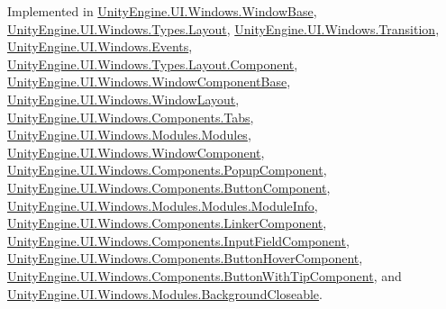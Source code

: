 Implemented in \hyperlink{class_unity_engine_1_1_u_i_1_1_windows_1_1_window_base_ae2b1948daf5cc1550c7c08b1b07a7a74}{Unity\+Engine.\+U\+I.\+Windows.\+Window\+Base}, \hyperlink{class_unity_engine_1_1_u_i_1_1_windows_1_1_types_1_1_layout_acdbf5db02e0c3468381e3c82ddf1ef2c}{Unity\+Engine.\+U\+I.\+Windows.\+Types.\+Layout}, \hyperlink{class_unity_engine_1_1_u_i_1_1_windows_1_1_transition_a29ec990775ca8e720766642979ebf1d0}{Unity\+Engine.\+U\+I.\+Windows.\+Transition}, \hyperlink{class_unity_engine_1_1_u_i_1_1_windows_1_1_events_a0288808124c86382568126812f19caab}{Unity\+Engine.\+U\+I.\+Windows.\+Events}, \hyperlink{class_unity_engine_1_1_u_i_1_1_windows_1_1_types_1_1_layout_1_1_component_af2dbb4b9d7070759dc1d694a15365daf}{Unity\+Engine.\+U\+I.\+Windows.\+Types.\+Layout.\+Component}, \hyperlink{class_unity_engine_1_1_u_i_1_1_windows_1_1_window_component_base_a191d5e3d4b11f768a8b9608ecce35b3b}{Unity\+Engine.\+U\+I.\+Windows.\+Window\+Component\+Base}, \hyperlink{class_unity_engine_1_1_u_i_1_1_windows_1_1_window_layout_a785bd1d79960daf9736fa3f7fc2c3ed3}{Unity\+Engine.\+U\+I.\+Windows.\+Window\+Layout}, \hyperlink{class_unity_engine_1_1_u_i_1_1_windows_1_1_components_1_1_tabs_a12746cec82ef3172a7bdc75683de7389}{Unity\+Engine.\+U\+I.\+Windows.\+Components.\+Tabs}, \hyperlink{class_unity_engine_1_1_u_i_1_1_windows_1_1_modules_1_1_modules_aa2909e616b3ab97a931597ad301cef79}{Unity\+Engine.\+U\+I.\+Windows.\+Modules.\+Modules}, \hyperlink{class_unity_engine_1_1_u_i_1_1_windows_1_1_window_component_aeecca9f3f46bb2cef3425c9d8b6b7618}{Unity\+Engine.\+U\+I.\+Windows.\+Window\+Component}, \hyperlink{class_unity_engine_1_1_u_i_1_1_windows_1_1_components_1_1_popup_component_a20976ce235a7ac78fdff867d4249840a}{Unity\+Engine.\+U\+I.\+Windows.\+Components.\+Popup\+Component}, \hyperlink{class_unity_engine_1_1_u_i_1_1_windows_1_1_components_1_1_button_component_a375e393586ef3f2475e44e64ed395dd3}{Unity\+Engine.\+U\+I.\+Windows.\+Components.\+Button\+Component}, \hyperlink{class_unity_engine_1_1_u_i_1_1_windows_1_1_modules_1_1_modules_1_1_module_info_a920e823c5d11b1ff7a57ee91d44cdf9e}{Unity\+Engine.\+U\+I.\+Windows.\+Modules.\+Modules.\+Module\+Info}, \hyperlink{class_unity_engine_1_1_u_i_1_1_windows_1_1_components_1_1_linker_component_ace9cdc3dc7abebb32198cc935eda3164}{Unity\+Engine.\+U\+I.\+Windows.\+Components.\+Linker\+Component}, \hyperlink{class_unity_engine_1_1_u_i_1_1_windows_1_1_components_1_1_input_field_component_a003d6f467f3211b3b55e03ad488f9a40}{Unity\+Engine.\+U\+I.\+Windows.\+Components.\+Input\+Field\+Component}, \hyperlink{class_unity_engine_1_1_u_i_1_1_windows_1_1_components_1_1_button_hover_component_a998b7123aa963e0f17f0c6748554da76}{Unity\+Engine.\+U\+I.\+Windows.\+Components.\+Button\+Hover\+Component}, \hyperlink{class_unity_engine_1_1_u_i_1_1_windows_1_1_components_1_1_button_with_tip_component_ab641deb8b76f185620ccd16aba85a205}{Unity\+Engine.\+U\+I.\+Windows.\+Components.\+Button\+With\+Tip\+Component}, and \hyperlink{class_unity_engine_1_1_u_i_1_1_windows_1_1_modules_1_1_background_closeable_a56f9be6f385591528eedfedd676a144b}{Unity\+Engine.\+U\+I.\+Windows.\+Modules.\+Background\+Closeable}.

